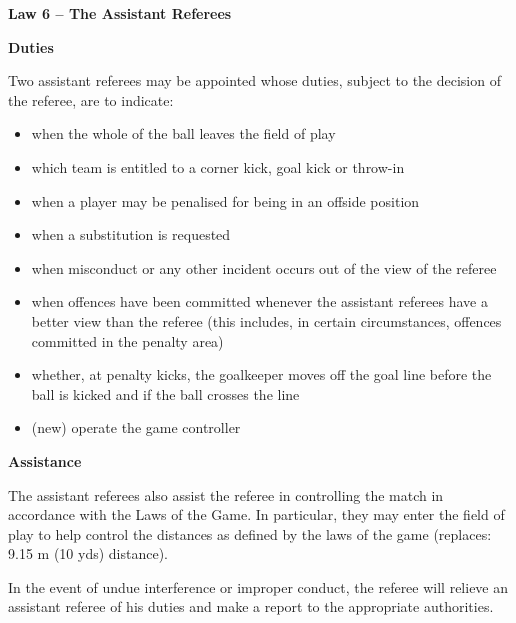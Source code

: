 \clearpage
\sffamily
{\bfseries\color[rgb]{0.4,0.4,0.4}
Law 6 -- The Assistant Referees}


\bigskip

{\bfseries Duties}

\headlinebox

Two assistant referees may be appointed whose duties, subject to the decision of the referee, are to indicate:

\begin{itemize}
\item when the whole of the ball leaves the field of play
\item which team is entitled to a corner kick, goal kick or throw-in
\item when a player may be penalised for being in an offside position 
\item when a substitution is requested
\item when misconduct or any other incident occurs out of the view of the referee 
\item when offences have been committed whenever the assistant referees have a better view than the referee (this includes, in certain circumstances, offences committed in the penalty area) 
\item whether, at penalty kicks, the goalkeeper moves off the goal line before the ball is kicked and if the ball crosses the line
\item (new) operate the game controller
\end{itemize}

{\bfseries Assistance}

\headlinebox

The assistant referees also assist the referee in controlling the match in accordance with the Laws of the Game. In particular, they may enter the field of play to help control the distances as defined by the laws of the game 
\textcolor[rgb]{0.4,0.4,0.4}{(replaces: 9.15 m (10 yds)
distance)}.

\bigskip

In the event of undue interference or improper conduct, the referee will relieve an assistant referee of his duties and make a report to the appropriate authorities.